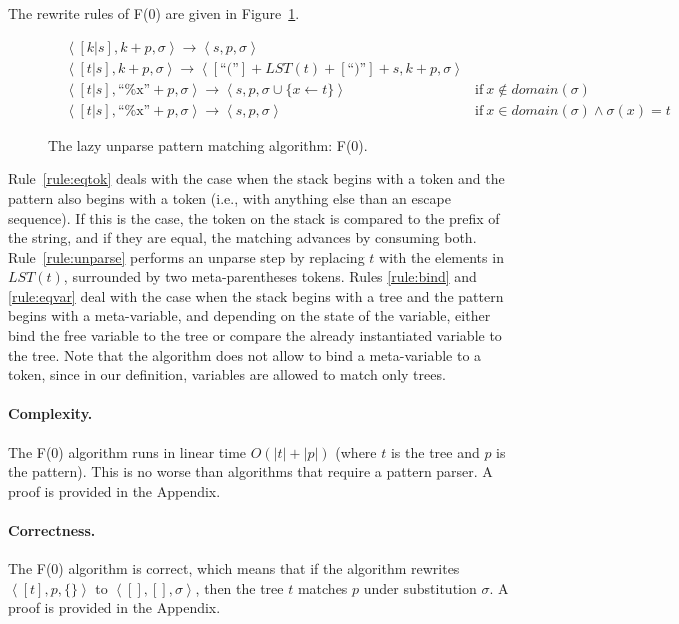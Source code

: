 \documentclass{sigplanconf}
\begin{document}
The rewrite rules of F(0) are given in Figure~\ref{fig:llpm}.
\begin{figure}
\begin{eqnarray}
\label{rule:eqtok}
&\left<[k | s], k+p, \sigma\right> \longrightarrow 
  \left<s, p, \sigma\right> \\
\label{rule:unparse}
&\left<[t | s], k+p, \sigma\right> \longrightarrow 
  \left<[\mbox{``(''}]+LST(t)+[\mbox{``)''}]+s, k+p, \sigma\right> \\
\label{rule:bind}
&\left<[t | s], \mbox{``\%x''}+p, \sigma\right> \longrightarrow 
  \left<s, p, \sigma \cup \{x\gets t\}\right> 
  & \mbox{if}\  x\not\in domain(\sigma) \\
\label{rule:eqvar}
&\left<[t | s], \mbox{``\%x''}+p, \sigma\right> \longrightarrow 
  \left<s, p, \sigma\right> 
  & \mbox{if}\  x\in domain(\sigma) \land \sigma(x)=t
\end{eqnarray}
\caption{The lazy unparse pattern matching algorithm: F(0).}
\label{fig:llpm}
\end{figure}

Rule~\ref{rule:eqtok} deals with the case when the stack begins with a
token and the pattern also begins with a token (i.e., with anything
else than an escape sequence). If this is the case, the token on the
stack is compared to the prefix of the string, and if they are equal,
the matching advances by consuming both. Rule~\ref{rule:unparse}
performs an unparse step by replacing $t$ with the elements in
$LST(t)$, surrounded by two meta-parentheses tokens. Rules
\ref{rule:bind} and \ref{rule:eqvar} deal with the case when the stack
begins with a tree and the pattern begins with a meta-variable, and
depending on the state of the variable, either bind the free variable
to the tree or compare the already instantiated variable to the
tree. Note that the algorithm does not allow to bind a meta-variable
to a token, since in our definition, variables are allowed to match
only trees.

\paragraph{Complexity.}
The F(0) algorithm runs in linear time $O(|t|+|p|)$ (where $t$ is the
tree and $p$ is the pattern). This is no worse than algorithms that
require a pattern parser. A proof is provided in the Appendix.

\paragraph{Correctness.}
The F(0) algorithm is correct, which means that if the algorithm
rewrites $\left<[t], p, \{\}\right>$ to $\left<[], [], \sigma\right>$,
then the tree $t$ matches $p$ under substitution $\sigma$. A proof is
provided in the Appendix.
\end{document}
